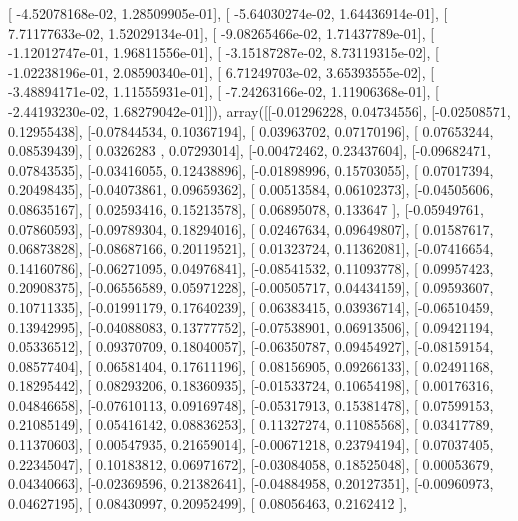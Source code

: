 \documentclass{article}
\begin{document}
       [ -4.52078168e-02,   1.28509905e-01],
       [ -5.64030274e-02,   1.64436914e-01],
       [  7.71177633e-02,   1.52029134e-01],
       [ -9.08265466e-02,   1.71437789e-01],
       [ -1.12012747e-01,   1.96811556e-01],
       [ -3.15187287e-02,   8.73119315e-02],
       [ -1.02238196e-01,   2.08590340e-01],
       [  6.71249703e-02,   3.65393555e-02],
       [ -3.48894171e-02,   1.11555931e-01],
       [ -7.24263166e-02,   1.11906368e-01],
       [ -2.44193230e-02,   1.68279042e-01]]), array([[-0.01296228,  0.04734556],
       [-0.02508571,  0.12955438],
       [-0.07844534,  0.10367194],
       [ 0.03963702,  0.07170196],
       [ 0.07653244,  0.08539439],
       [ 0.0326283 ,  0.07293014],
       [-0.00472462,  0.23437604],
       [-0.09682471,  0.07843535],
       [-0.03416055,  0.12438896],
       [-0.01898996,  0.15703055],
       [ 0.07017394,  0.20498435],
       [-0.04073861,  0.09659362],
       [ 0.00513584,  0.06102373],
       [-0.04505606,  0.08635167],
       [ 0.02593416,  0.15213578],
       [ 0.06895078,  0.133647  ],
       [-0.05949761,  0.07860593],
       [-0.09789304,  0.18294016],
       [ 0.02467634,  0.09649807],
       [ 0.01587617,  0.06873828],
       [-0.08687166,  0.20119521],
       [ 0.01323724,  0.11362081],
       [-0.07416654,  0.14160786],
       [-0.06271095,  0.04976841],
       [-0.08541532,  0.11093778],
       [ 0.09957423,  0.20908375],
       [-0.06556589,  0.05971228],
       [-0.00505717,  0.04434159],
       [ 0.09593607,  0.10711335],
       [-0.01991179,  0.17640239],
       [ 0.06383415,  0.03936714],
       [-0.06510459,  0.13942995],
       [-0.04088083,  0.13777752],
       [-0.07538901,  0.06913506],
       [ 0.09421194,  0.05336512],
       [ 0.09370709,  0.18040057],
       [-0.06350787,  0.09454927],
       [-0.08159154,  0.08577404],
       [ 0.06581404,  0.17611196],
       [ 0.08156905,  0.09266133],
       [ 0.02491168,  0.18295442],
       [ 0.08293206,  0.18360935],
       [-0.01533724,  0.10654198],
       [ 0.00176316,  0.04846658],
       [-0.07610113,  0.09169748],
       [-0.05317913,  0.15381478],
       [ 0.07599153,  0.21085149],
       [ 0.05416142,  0.08836253],
       [ 0.11327274,  0.11085568],
       [ 0.03417789,  0.11370603],
       [ 0.00547935,  0.21659014],
       [-0.00671218,  0.23794194],
       [ 0.07037405,  0.22345047],
       [ 0.10183812,  0.06971672],
       [-0.03084058,  0.18525048],
       [ 0.00053679,  0.04340663],
       [-0.02369596,  0.21382641],
       [-0.04884958,  0.20127351],
       [-0.00960973,  0.04627195],
       [ 0.08430997,  0.20952499],
       [ 0.08056463,  0.2162412 ],
\end{document}
